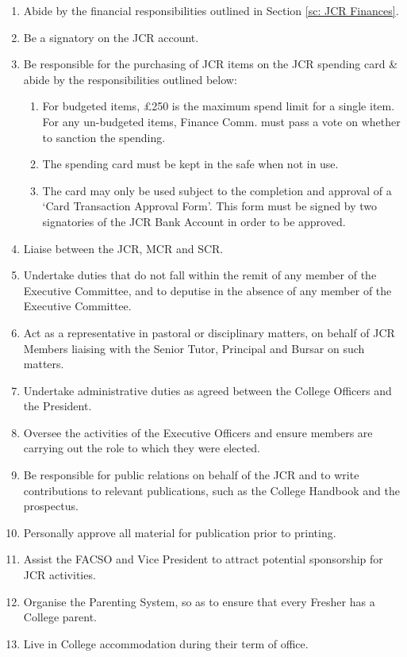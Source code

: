\begin{enumerate}
        \item Abide by the financial responsibilities outlined in Section \ref{sc: JCR Finances}.
        \item Be a signatory on the JCR account.
        \item Be responsible for the purchasing of JCR items on the JCR spending card \& abide by the responsibilities outlined below:
        \begin{enumerate}
            \item For budgeted items, £250 is the maximum spend limit for a single item. For any un-budgeted items, Finance Comm. must pass a vote on whether to sanction the spending.
            \item The spending card must be kept in the safe when not in use.
            \item The card may only be used subject to the completion and approval of a ‘Card Transaction Approval Form’. This form must be signed by two signatories of the JCR Bank Account in order to be approved.
        \end{enumerate}
        \item Liaise between the JCR, MCR and SCR.
        \item Undertake duties that do not fall within the remit of any member of the Executive Committee, and to deputise in the absence of any member of the Executive Committee.
        \item Act as a representative in pastoral or disciplinary matters, on behalf of JCR Members liaising with the Senior Tutor, Principal and Bursar on such matters.
        \item Undertake administrative duties as agreed between the College Officers and the President.
        \item Oversee the activities of the Executive Officers and ensure members are carrying out the role to which they were elected.
        \item Be responsible for public relations on behalf of the JCR and to write contributions to relevant publications, such as the College Handbook and the prospectus.
        \item Personally approve all material for publication prior to printing.
        \item Assist the FACSO and Vice President to attract potential sponsorship for JCR activities.
        \item Organise the Parenting System, so as to ensure that every Fresher has a College parent.
        \item Live in College accommodation during their term of office.

\end{enumerate}
